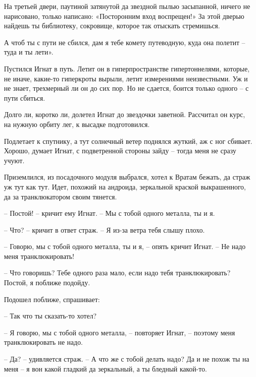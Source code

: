 \documentclass[ebook,oneside,final,openright]{memoir}
\begin{document}
\par
На третьей двери, паутиной затянутой да звездной пылью засыпанной, ничего не нарисовано, только написано: «Посторонним вход воспрещен!» За этой дверью найдешь ты библиотеку, сокровище, которое так отыскать стремишься.\par
\par
А чтоб ты с пути не сбился, дам я тебе комету путеводную, куда она полетит – туда и ты лети».\par
\par
Пустился Игнат в путь. Летит он в гиперпространстве гипертоннелями, которые, не иначе, какие-то гиперкроты вырыли, летит измерениями неизвестными. Уж и не знает, трехмерный ли он до сих пор. Но не сдается, боится только одного – с пути сбиться.\par
\par
Долго ли, коротко ли, долетел Игнат до звездочки заветной. Рассчитал он курс, на нужную орбиту лег, к высадке подготовился.\par
\par
Подлетает к спутнику, а тут солнечный ветер поднялся жуткий, аж с ног сбивает. Хорошо, думает Игнат, с подветренной стороны зайду – тогда меня не сразу учуют. \par
\par
 Приземлился, из посадочного модуля выбрался, хотел к Вратам бежать, да страж уж тут как тут. Идет, похожий на андроида, зеркальной краской выкрашенного, да за транклюкатором своим тянется. \par
 \par
– Постой! – кричит ему Игнат. – Мы с тобой одного металла, ты и я. \par
– Что? – кричит в ответ страж. – Я из-за ветра тебя слышу плохо. \par
– Говорю, мы с тобой одного металла, ты и я, – опять кричит Игнат. – Не надо меня транклюкировать!\par
– Что говоришь? Тебе одного раза мало, если надо тебя транклюкировать? Постой, я поближе подойду. \par
Подошел поближе, спрашивает: \par
– Так что ты сказать-то хотел? \par
– Я говорю, мы с тобой одного металла, – повторяет Игнат, – поэтому меня транклюкировать не надо. \par
– Да? – удивляется страж. – А что же с тобой делать надо? Да и не похож ты на меня – я вон какой гладкий да зеркальный, а ты бледный какой-то. \par
\end{document}
